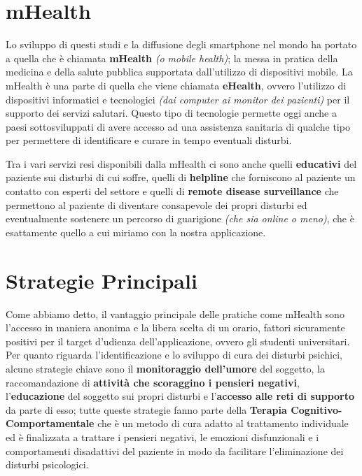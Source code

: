 \section{mHealth}
Lo sviluppo di questi studi e la diffusione degli smartphone nel mondo ha portato a quella che è chiamata \textbf{mHealth} \textit{(o mobile health)}; la messa in pratica della medicina e della salute pubblica supportata dall'utilizzo di dispositivi mobile\cite{mHealth}.
La mHealth è una parte di quella che viene chiamata \textbf{eHealth}, ovvero l'utilizzo di dispositivi informatici e tecnologici \textit{(dai computer ai monitor dei pazienti)} per il supporto dei servizi salutari.
Questo tipo di tecnologie permette oggi anche a paesi sottosviluppati di avere accesso ad una assistenza sanitaria di qualche tipo per permettere di identificare e curare in tempo eventuali disturbi.

Tra i vari servizi resi disponibili dalla mHealth ci sono anche quelli \textbf{educativi} del paziente sui disturbi di cui soffre, quelli di \textbf{helpline} che forniscono al paziente un contatto con esperti del settore e quelli di \textbf{remote disease surveillance} che permettono al paziente di diventare consapevole dei propri disturbi ed eventualmente sostenere un percorso di guarigione \textit{(che sia online o meno)}, che è esattamente quello a cui miriamo con la nostra applicazione.

\section{Strategie Principali}
Come abbiamo detto, il vantaggio principale delle pratiche come mHealth sono l'accesso in
maniera anonima e la libera scelta di un orario, fattori sicuramente positivi per il target d'udienza dell'applicazione, ovvero gli studenti universitari.
Per quanto riguarda l'identificazione e lo sviluppo di cura dei disturbi psichici, alcune strategie chiave sono il \textbf{monitoraggio dell'umore} del soggetto, la raccomandazione di \textbf{attività che scoraggino i pensieri negativi}, l'\textbf{educazione} del soggetto sui propri disturbi e l'\textbf{accesso alle reti di supporto} da parte di esso; tutte queste strategie fanno parte della \textbf{Terapia Cognitivo-Comportamentale} \cite{CBT} che è un metodo di cura adatto al trattamento individuale ed è finalizzata a trattare i pensieri negativi, le emozioni disfunzionali e i comportamenti disadattivi del paziente in modo da facilitare l'eliminazione dei disturbi psicologici.

